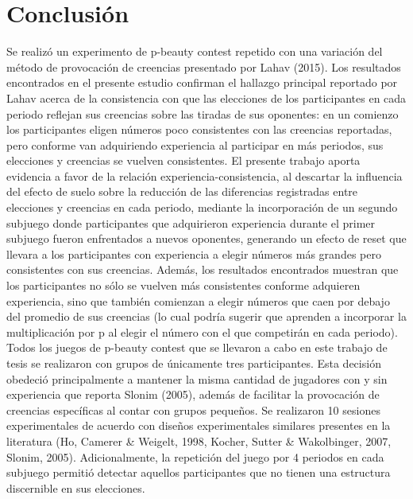 
\chapter{Conclusión} %

\label{Cap_Conclusion} %

Se realizó un experimento de p-beauty contest repetido con una variación del método de provocación de creencias presentado por Lahav (2015). Los resultados encontrados en el presente estudio confirman el hallazgo principal reportado por Lahav acerca de la consistencia con que las elecciones de los participantes en cada periodo reflejan sus creencias sobre las tiradas de sus oponentes: en un comienzo los participantes eligen números poco consistentes con las creencias reportadas, pero conforme van adquiriendo experiencia al participar en más periodos, sus elecciones y creencias se vuelven consistentes. El presente trabajo aporta evidencia a favor de la relación experiencia-consistencia, al descartar la influencia del efecto de suelo sobre la reducción de las diferencias registradas entre elecciones y creencias en cada periodo, mediante la incorporación de un segundo subjuego donde participantes que adquirieron experiencia durante el primer subjuego fueron enfrentados a nuevos oponentes, generando un efecto de reset que llevara a los participantes con experiencia a elegir números más grandes pero consistentes con sus creencias.
Además, los resultados encontrados muestran que los participantes no sólo se vuelven más consistentes conforme adquieren experiencia, sino que también comienzan a elegir números que caen por debajo del promedio de sus creencias (lo cual podría sugerir que aprenden a incorporar la multiplicación por p al elegir el número con el que competirán en cada periodo).
Todos los juegos de p-beauty contest que se llevaron a cabo en este trabajo de tesis se realizaron con grupos de únicamente tres participantes. Esta decisión obedeció principalmente a mantener la misma cantidad de jugadores con y sin experiencia que reporta Slonim (2005), además de facilitar la provocación de creencias específicas al contar con grupos pequeños. Se realizaron 10 sesiones experimentales de acuerdo con diseños experimentales similares presentes en la literatura (Ho, Camerer & Weigelt, 1998, Kocher, Sutter & Wakolbinger, 2007, Slonim, 2005). Adicionalmente, la repetición del juego por 4 periodos en cada subjuego permitió detectar aquellos participantes que no tienen una estructura discernible en sus elecciones.
